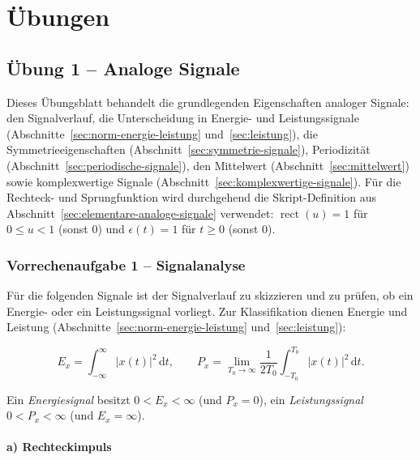 \chapter{Übungen}

\section{Übung 1 – Analoge Signale}

Dieses Übungsblatt behandelt die grundlegenden Eigenschaften analoger Signale:
den Signalverlauf, die Unterscheidung in Energie- und Leistungssignale
(Abschnitte~\ref{sec:norm-energie-leistung} und~\ref{sec:leistung}), die
Symmetrieeigenschaften (Abschnitt~\ref{sec:symmetrie-signale}), Periodizität
(Abschnitt~\ref{sec:periodische-signale}), den Mittelwert
(Abschnitt~\ref{sec:mittelwert}) sowie komplexwertige Signale
(Abschnitt~\ref{sec:komplexwertige-signale}). Für die Rechteck- und
Sprungfunktion wird durchgehend die Skript-Definition aus
Abschnitt~\ref{sec:elementare-analoge-signale} verwendet:
$\operatorname{rect}(u) = 1$ für $0 \leq u < 1$ (sonst $0$) und
$\epsilon(t) = 1$ für $t \geq 0$ (sonst $0$).

\subsection*{Vorrechenaufgabe 1 – Signalanalyse}

Für die folgenden Signale ist der Signalverlauf zu skizzieren und zu prüfen, ob
ein Energie- oder ein Leistungssignal vorliegt. Zur Klassifikation dienen
Energie und Leistung (Abschnitte~\ref{sec:norm-energie-leistung}
und~\ref{sec:leistung}):

$$
E_x = \int_{-\infty}^{\infty} |x(t)|^2\,\mathrm{d}t,
\qquad
P_x = \lim_{T_0 \to \infty} \frac{1}{2T_0} \int_{-T_0}^{T_0} |x(t)|^2\,\mathrm{d}t.
$$

Ein \emph{Energiesignal} besitzt $0 < E_x < \infty$ (und $P_x = 0$), ein
\emph{Leistungssignal} $0 < P_x < \infty$ (und $E_x = \infty$).

\subsubsection*{a) Rechteckimpuls}

